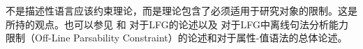 不是描述性语言应该约束理论，而是理论包含了必须适用于研究对象的限制。这是 \citet[, 280]{Chomsky81b}所持的观点。也可以参见 和 对于LFG的论述以及 对于LFG中离线句法分析能力限制（Off-Line Parsability Constraint）的论述和对于属性-值语法的总体论述。
